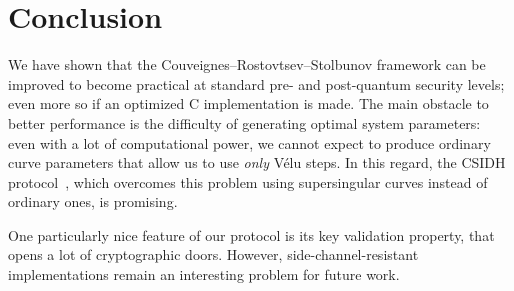 \documentclass{llncs}
\begin{document}
\section{Conclusion}

We have shown that the Couveignes--Rostovtsev--Stolbunov
framework can be improved to become practical at standard pre- and
post-quantum security levels; 
even more so if an optimized C implementation is made. 
The main obstacle to better performance 
is the difficulty of generating optimal system parameters:
even with a lot of computational power,
we cannot expect to produce ordinary curve parameters
that allow us to use \emph{only} Vélu steps. 
In this regard, the CSIDH protocol~\cite{csidh}, 
which overcomes this problem using
supersingular curves instead of ordinary ones, is promising.

One particularly nice feature of our protocol is its key validation property,
that opens a lot of cryptographic doors. However, side-channel-resistant
implementations remain an interesting problem for future work.




\end{document}
